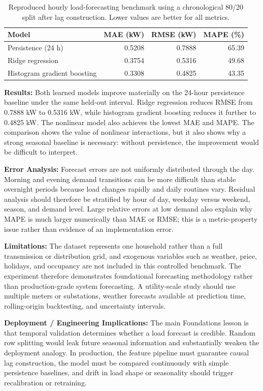 \begin{table}[t]
\centering
\small
\caption{Reproduced hourly load-forecasting benchmark using a chronological 80/20 split after lag construction. Lower values are better for all metrics.}
\label{tab:ch1-smart-grid-benchmark}
\begin{tabular}{lrrr}
\toprule
Model & MAE (kW) & RMSE (kW) & MAPE (\%) \\
\midrule
Persistence (24 h) & 0.5208 & 0.7888 & 65.39 \\
Ridge regression & 0.3754 & 0.5316 & 49.68 \\
Histogram gradient boosting & 0.3308 & 0.4825 & 43.35 \\
\bottomrule
\end{tabular}
\end{table}

\textbf{Results:} Both learned models improve materially on the 24-hour persistence baseline under the same held-out interval. Ridge regression reduces RMSE from 0.7888 kW to 0.5316 kW, while histogram gradient boosting reduces it further to 0.4825 kW. The nonlinear model also achieves the lowest MAE and MAPE. The comparison shows the value of nonlinear interactions, but it also shows why a strong seasonal baseline is necessary: without persistence, the improvement would be difficult to interpret.

\textbf{Error Analysis:} Forecast errors are not uniformly distributed through the day. Morning and evening demand transitions can be more difficult than stable overnight periods because load changes rapidly and daily routines vary. Residual analysis should therefore be stratified by hour of day, weekday versus weekend, season, and demand level. Large relative errors at low demand also explain why MAPE is much larger numerically than MAE or RMSE; this is a metric-property issue rather than evidence of an implementation error.

\textbf{Limitations:} The dataset represents one household rather than a full transmission or distribution grid, and exogenous variables such as weather, price, holidays, and occupancy are not included in this controlled benchmark. The experiment therefore demonstrates foundational forecasting methodology rather than production-grade system forecasting. A utility-scale study should use multiple meters or substations, weather forecasts available at prediction time, rolling-origin backtesting, and uncertainty intervals.

\textbf{Deployment / Engineering Implications:} The main Foundations lesson is that temporal validation determines whether a load forecast is credible. Random row splitting would leak future seasonal information and substantially weaken the deployment analogy. In production, the feature pipeline must guarantee causal lag construction, the model must be compared continuously with simple persistence baselines, and drift in load shape or seasonality should trigger recalibration or retraining.
